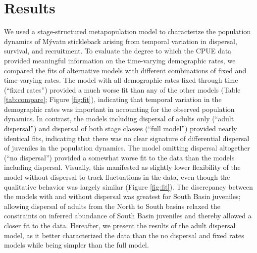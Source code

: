 \documentclass[11pt]{article}
\begin{document}

\section*{Results}

We used a stage-structured metapopulation model
to characterize the population dynamics of M\'{y}vatn stickleback
arising from temporal variation in dispersal, survival, and recruitment.
To evaluate the degree to which the CPUE data provided meaningful 
information on the time-varying demographic rates,
we compared the fits of alternative models
with different combinations of fixed and time-varying rates.
The model with all demographic rates fixed through time (``fixed rates'')
provided a much worse fit than any of the other models
(Table \ref{tab:compare}; Figure \ref{fig:fit}),
indicating that temporal variation in the demographic rates was important in accounting 
for the observed population dynamics.
In contrast, the models including dispersal of adults only (``adult dispersal'') 
and dispersal of both stage classes (``full model'') 
provided nearly identical fits, 
indicating that there was no clear signature of differential dispersal 
of juveniles in the population dynamics.
The model omitting dispersal altogether (``no dispersal'') 
provided a somewhat worse fit to the data than the models including dispersal.
Visually, this manifested as slightly lower flexibility of the model without dispersal
to track fluctuations in the data, 
even though the qualitative behavior was largely similar (Figure \ref{fig:fit}).
The discrepancy between the models with and without dispersal was greatest
for South Basin juveniles;
allowing dispersal of adults from the North to South basins relaxed the constraints 
on inferred abundance of South Basin juveniles and thereby allowed a closer fit to the data.
Hereafter, we present the results of the adult dispersal model,
as it better characterized the data than the no dispersal and fixed rates
models while being simpler than the full model.
\end{document}
